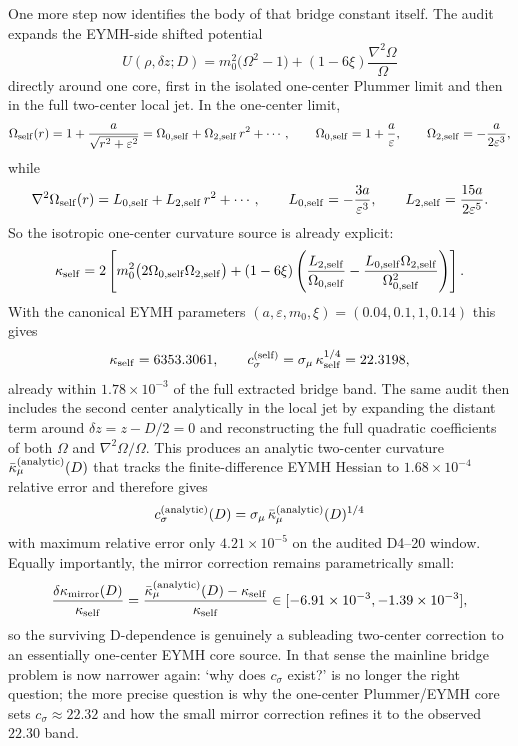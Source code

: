 \documentclass[aps,prd,onecolumn,notitlepage,nofootinbib,superscriptaddress,11pt,floatfix]{revtex4-2}
\begin{document}
One more step now identifies the body of that bridge constant itself. The audit  expands the EYMH-side shifted potential
\[
U(\rho,\delta z;D)=m_0^2\bigl(\Omega^2-1\bigr)+(1-6\xi)\frac{\nabla^2\Omega}{\Omega}
\]
directly around one core, first in the isolated one-center Plummer limit and then in the full two-center local jet. In the one-center limit,
\[
\Omega_{\rm self}(r)=1+\frac{a}{\sqrt{r^2+\varepsilon^2}}
=
\Omega_{0,{\rm self}}+\Omega_{2,{\rm self}}\,r^2+\cdots,
\qquad
\Omega_{0,{\rm self}}=1+\frac{a}{\varepsilon},
\qquad
\Omega_{2,{\rm self}}=-\frac{a}{2\varepsilon^3},
\]
while
\[
\nabla^2\Omega_{\rm self}(r)
=
L_{0,{\rm self}}+L_{2,{\rm self}}\,r^2+\cdots,
\qquad
L_{0,{\rm self}}=-\frac{3a}{\varepsilon^3},
\qquad
L_{2,{\rm self}}=\frac{15a}{2\varepsilon^5}.
\]
So the isotropic one-center curvature source is already explicit:
\[
\kappa_{\rm self}
=
2\left[
m_0^2\bigl(2\Omega_{0,{\rm self}}\Omega_{2,{\rm self}}\bigr)
+(1-6\xi)\left(\frac{L_{2,{\rm self}}}{\Omega_{0,{\rm self}}}
-\frac{L_{0,{\rm self}}\Omega_{2,{\rm self}}}{\Omega_{0,{\rm self}}^2}\right)
\right].
\]
With the canonical EYMH parameters $(a,\varepsilon,m_0,\xi)=(0.04,0.1,1,0.14)$ this gives
\[
\kappa_{\rm self}=6353.3061,
\qquad
c_\sigma^{\rm(self)}=\sigma_\mu\,\kappa_{\rm self}^{1/4}=22.3198,
\]
already within $1.78\times10^{-3}$ of the full extracted bridge band. The same audit then includes the second center analytically in the local jet by expanding the distant term around $\delta z=z-D/2=0$ and reconstructing the full quadratic coefficients of both $\Omega$ and $\nabla^2\Omega/\Omega$. This produces an analytic two-center curvature $\bar\kappa_\mu^{\rm(analytic)}(D)$ that tracks the finite-difference EYMH Hessian to $1.68\times10^{-4}$ relative error and therefore gives
\[
c_\sigma^{\rm(analytic)}(D)=\sigma_\mu\,\bar\kappa_\mu^{\rm(analytic)}(D)^{1/4}
\]
with maximum relative error only $4.21\times10^{-5}$ on the audited D4--20 window. Equally importantly, the mirror correction remains parametrically small:
\[
\frac{\delta\kappa_{\rm mirror}(D)}{\kappa_{\rm self}}
=
\frac{\bar\kappa_\mu^{\rm(analytic)}(D)-\kappa_{\rm self}}{\kappa_{\rm self}}
\in[-6.91\times10^{-3},-1.39\times10^{-3}],
\]
so the surviving D-dependence is genuinely a subleading two-center correction to an essentially one-center EYMH core source. In that sense the mainline bridge problem is now narrower again: `why does $c_\sigma$ exist?' is no longer the right question; the more precise question is why the one-center Plummer/EYMH core sets $c_\sigma\approx22.32$ and how the small mirror correction refines it to the observed $22.30$ band.
\end{document}
